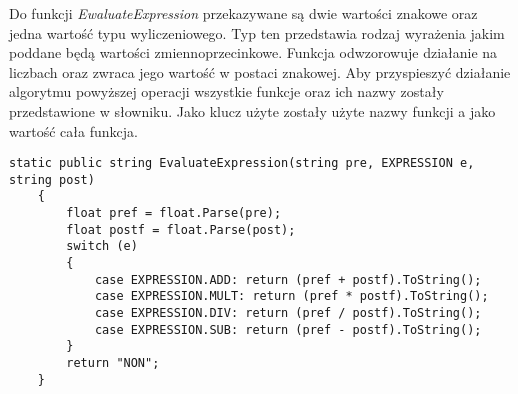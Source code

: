 \documentclass[12pt]{report}
\begin{document}
\begin{sloppypar}
Do funkcji \textit{EwaluateExpression} przekazywane są dwie wartości znakowe oraz jedna wartość typu wyliczeniowego. Typ ten przedstawia rodzaj wyrażenia jakim poddane będą wartości zmiennoprzecinkowe. Funkcja odwzorowuje działanie na liczbach oraz zwraca jego wartość w postaci znakowej. 
Aby przyspieszyć działanie algorytmu powyższej operacji wszystkie funkcje oraz ich nazwy zostały przedstawione w słowniku. Jako klucz użyte zostały użyte nazwy funkcji a jako wartość cała funkcja.
\newpage
\begin{lstlisting}[label=execute,caption=Funkcja pomocnicza do obliczania wartosci funkcji. ,belowcaptionskip=4pt,captionpos=b]
    static public string EvaluateExpression(string pre, EXPRESSION e, string post)
    {
        float pref = float.Parse(pre);
        float postf = float.Parse(post);
        switch (e)
        {
            case EXPRESSION.ADD: return (pref + postf).ToString(); 
            case EXPRESSION.MULT: return (pref * postf).ToString(); 
            case EXPRESSION.DIV: return (pref / postf).ToString(); 
            case EXPRESSION.SUB: return (pref - postf).ToString();
        }
        return "NON";
    }
\end{lstlisting}


\end{sloppypar}
\end{document}
